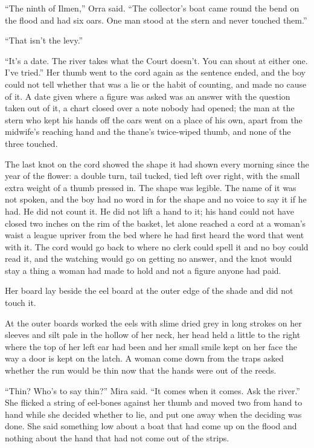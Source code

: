 “The ninth of Ilmen,” Orra said. “The collector's boat came round the bend on the flood and had six oars. One man stood at the stern and never touched them.”

“That isn't the levy.”

“It's a date. The river takes what the Court doesn't. You can shout at either one. I've tried.” Her thumb went to the cord again as the sentence ended, and the boy could not tell whether that was a lie or the habit of counting, and made no cause of it. A date given where a figure was asked was an answer with the question taken out of it, a chart closed over a note nobody had opened; the man at the stern who kept his hands off the oars went on a place of his own, apart from the midwife's reaching hand and the thane's twice-wiped thumb, and none of the three touched.

The last knot on the cord showed the shape it had shown every morning since the year of the flower: a double turn, tail tucked, tied left over right, with the small extra weight of a thumb pressed in. The shape was legible. The name of it was not spoken, and the boy had no word in  for the shape and no voice to say it if he had. He did not count it. He did not lift a hand to it; his hand could not have closed two inches on the rim of the basket, let alone reached a cord at a woman's waist a league upriver from the bed where he had first heard the word that went with it. The cord would go back to  where no clerk could spell it and no boy could read it, and the watching would go on getting no answer, and the knot would stay a thing a woman had made to hold and not a figure anyone had paid.

Her board lay beside the eel board at the outer edge of the shade and did not touch it.

At the outer boards  worked the eels with slime dried grey in long strokes on her sleeves and silt pale in the hollow of her neck, her head held a little to the right where the top of her left ear had been and her small smile kept on her face the way a door is kept on the latch. A woman come down from the traps asked whether the run would be thin now that the hands were out of the reeds.

“Thin? Who's to say thin?” Mira said. “It comes when it comes. Ask the river.” She flicked a string of eel-bones against her thumb and moved two from hand to hand while she decided whether to lie, and put one away when the deciding was done. She said something low about a boat that had come up on the flood and nothing about the hand that had not come out of the strips.

